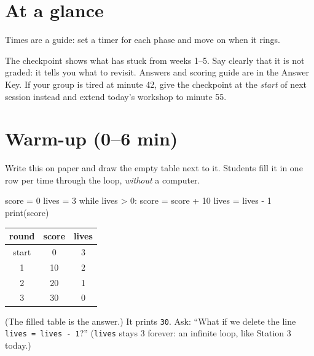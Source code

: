 \section{At a glance}
Times are a guide: set a timer for each phase and move on when it rings.
\begin{timeplan}
\end{timeplan}

\begin{teachernote}
The checkpoint shows what has stuck from weeks 1--5. Say clearly that it is not graded: it tells you what to revisit.
Answers and scoring guide are in the Answer Key. If your group is tired at minute 42, give the checkpoint at the
\emph{start} of next session instead and extend today's workshop to minute 55.
\end{teachernote}

\section{Warm-up (0--6 min)}
\begin{unplugged}
Write this on paper and draw the empty table next to it. Students fill it in one row per time through the loop, \emph{without} a computer.
\begin{center}
\begin{minipage}{0.45\linewidth}
\begin{pycode}
score = 0
lives = 3
while lives > 0:
    score = score + 10
    lives = lives - 1
print(score)
\end{pycode}
\end{minipage}\hfill
\begin{minipage}{0.4\linewidth}
\renewcommand{\arraystretch}{1.3}
\begin{tabular}{|c|c|c|}
\hline \textbf{round} & \textbf{score} & \textbf{lives} \\ \hline
start & 0 & 3 \\ \hline
1 & 10 & 2 \\ \hline
2 & 20 & 1 \\ \hline
3 & 30 & 0 \\ \hline
\end{tabular}
\end{minipage}
\end{center}
(The filled table is the answer.) It prints \texttt{30}. Ask: \enquote{What if we delete the line \texttt{lives = lives - 1}?}
(\texttt{lives} stays 3 forever: an infinite loop, like Station 3 today.)
\end{unplugged}

